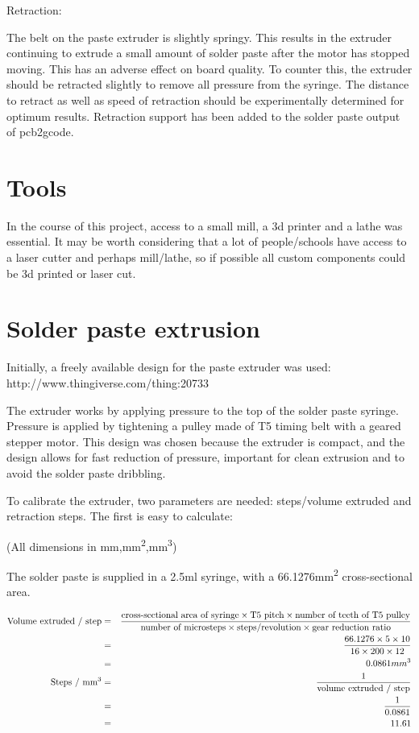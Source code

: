 Retraction:

The belt on the paste extruder is slightly springy. This results in the extruder continuing to extrude a small amount of solder paste after the motor has stopped moving.
This has an adverse effect on board quality. To counter this, the extruder should be retracted slightly to remove all pressure from the syringe. The distance to retract
as well as speed of retraction should be experimentally determined for optimum results. Retraction support has been added to the solder paste output of pcb2gcode.

\section{Tools}
In the course of this project, access to a small mill, a 3d printer and a lathe was essential. It may be worth considering that a lot of people/schools have
access to a laser cutter and perhaps mill/lathe, so if possible all custom components could be 3d printed or 
laser cut.

\section{Solder paste extrusion}
Initially, a freely available design for the paste extruder was used: http://www.thingiverse.com/thing:20733

The extruder works by applying pressure to the top of the solder paste syringe. Pressure is applied by tightening a pulley made
of T5 timing belt with a geared stepper motor. This design was chosen because the extruder is compact, and the design allows for
fast reduction of pressure, important for clean extrusion and to avoid the solder paste dribbling. 

To calibrate the extruder, two parameters are needed: steps/volume extruded and retraction steps. The first is easy to calculate:

(All dimensions in mm,mm\textsuperscript{2},mm\textsuperscript{3})

The solder paste is supplied in a 2.5ml syringe, with a 66.1276mm\textsuperscript{2} cross-sectional area.

\begin{eqnarray}
\text{Volume extruded / step} &=& \frac{\text{cross-sectional area of syringe} \times \text{T5 pitch} \times \text{number of teeth of T5 pulley}}{\text{number of microsteps} \times \text{steps/revolution} \times \text{gear reduction ratio}} \nonumber \\
&=&\frac{66.1276 \times 5 \times 10}{16 \times 200 \times 12} \nonumber \\
&=&0.0861mm\textsuperscript{3} \nonumber \\
	\text{Steps / mm\textsuperscript{3}} &=& \frac{1} {\text{volume extruded / step}} \nonumber \\
	&=& \frac{1}{ 0.0861} \nonumber \\
	&=& 11.61 \nonumber
\end{eqnarray}

